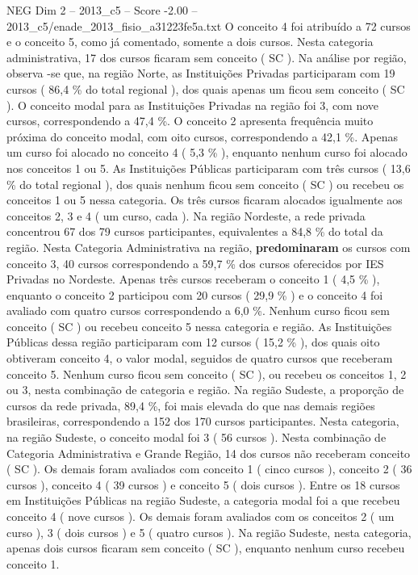 \begin{textsample}{NEG Dim 2 – 2013\_c5 – Score -2.00 – 2013\_c5/enade\_2013\_fisio\_a31223fe5a.txt}
O conceito 4 foi atribuído a 72 cursos e o conceito 5, como já comentado, somente a dois cursos.
Nesta categoria administrativa, 17 dos cursos ficaram sem conceito ( SC ).
Na análise por região, observa -se que, na região Norte, as Instituições Privadas participaram com 19 cursos ( 86,4 \% do total regional ), dos quais apenas um ficou sem conceito ( SC ).
O conceito modal para as Instituições Privadas na região foi 3, com nove cursos, correspondendo a 47,4 \%.
O conceito 2 apresenta frequência muito próxima do conceito modal, com oito cursos, correspondendo a 42,1 \%.
Apenas um curso foi alocado no conceito 4 ( 5,3 \% ), enquanto nenhum curso foi alocado nos conceitos 1 ou 5.
As Instituições Públicas participaram com três cursos ( 13,6 \% do total regional ), dos quais nenhum ficou sem conceito ( SC ) ou recebeu os conceitos 1 ou 5 nessa categoria.
Os três cursos ficaram alocados igualmente aos conceitos 2, 3 e 4 ( um curso, cada ).
Na região Nordeste, a rede privada concentrou 67 dos 79 cursos participantes, equivalentes a 84,8 \% do total da região.
Nesta Categoria Administrativa na região, \textbf{predominaram} os cursos com conceito 3, 40 cursos correspondendo a 59,7 \% dos cursos oferecidos por IES Privadas no Nordeste.
Apenas três cursos receberam o conceito 1 ( 4,5 \% ), enquanto o conceito 2 participou com 20 cursos ( 29,9 \% ) e o conceito 4 foi avaliado com quatro cursos correspondendo a 6,0 \%.
Nenhum curso ficou sem conceito ( SC ) ou recebeu conceito 5 nessa categoria e região.
As Instituições Públicas dessa região participaram com 12 cursos ( 15,2 \% ), dos quais oito obtiveram conceito 4, o valor modal, seguidos de quatro cursos que receberam conceito 5.
Nenhum curso ficou sem conceito ( SC ), ou recebeu os conceitos 1, 2 ou 3, nesta combinação de categoria e região.
Na região Sudeste, a proporção de cursos da rede privada, 89,4 \%, foi mais elevada do que nas demais regiões brasileiras, correspondendo a 152 dos 170 cursos participantes.
Nesta categoria, na região Sudeste, o conceito modal foi 3 ( 56 cursos ).
Nesta combinação de Categoria Administrativa e Grande Região, 14 dos cursos não receberam conceito ( SC ).
Os demais foram avaliados com conceito 1 ( cinco cursos ), conceito 2 ( 36 cursos ), conceito 4 ( 39 cursos ) e conceito 5 ( dois cursos ).
Entre os 18 cursos em Instituições Públicas na região Sudeste, a categoria modal foi a que recebeu conceito 4 ( nove cursos ).
Os demais foram avaliados com os conceitos 2 ( um curso ), 3 ( dois cursos ) e 5 ( quatro cursos ).
Na região Sudeste, nesta categoria, apenas dois cursos ficaram sem conceito ( SC ), enquanto nenhum curso recebeu conceito 1.

\end{textsample}
